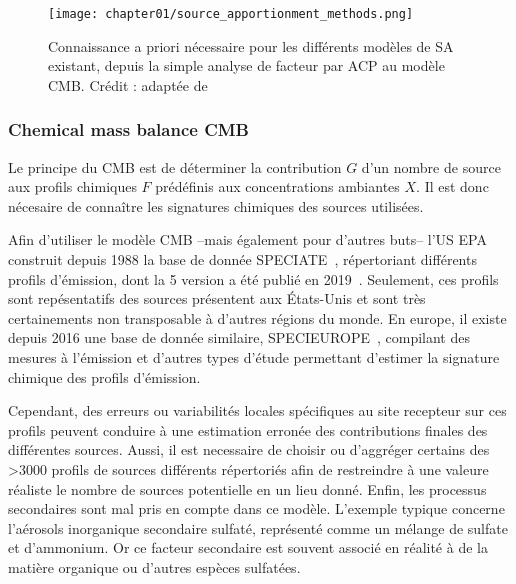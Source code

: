 \begin{figure}[ht]
    \centering
    \texttt{[image: chapter01/source\_apportionment\_methods.png]}
    \caption{
        Connaissance a priori nécessaire pour les différents modèles de SA existant,
        depuis la simple analyse de facteur par ACP au modèle CMB. Crédit :
        \textcite{vianaSource2008} adaptée de \textcite{schauerCharacterization2006}
    }%
    \label{fig:chapter01/source_apportionment_methods}
\end{figure}

\subsubsection{Chemical mass balance CMB}%
\label{ssub:chemical_mass_balance_cmb}

Le principe du CMB est de déterminer la contribution $G$ d'un nombre de source
aux profils chimiques $F$ prédéfinis aux concentrations ambiantes $X$. Il est donc
nécesaire de connaître les signatures chimiques des sources utilisées.

Afin d'utiliser le modèle CMB --mais également pour d'autres buts-- l'US EPA construit
depuis 1988 la base de donnée SPECIATE~\autocite{simonDevelopment2010}, répertoriant
différents profils d'émission, dont la 5\ieme{}
version a été publié en 2019~\autocite{u.s.environmentalprotectionagencySPECIATE2019}.
Seulement, ces profils sont repésentatifs des sources présentent aux États-Unis et sont
très certainements non transposable à d'autres régions du monde.
En europe, il existe depuis 2016 une base de donnée similaire,
SPECIEUROPE~\autocite{pernigottiSPECIEUROPE2016}, compilant des mesures à l'émission et
d'autres types d'étude permettant d'estimer la signature chimique des profils d'émission.

Cependant, des erreurs ou variabilités locales spécifiques au site recepteur sur ces
profils peuvent conduire à une estimation erronée des contributions finales des
différentes sources.
Aussi, il est necessaire de choisir ou d'aggréger certains des >3000 profils de sources
différents répertoriés afin de restreindre à une valeure réaliste le nombre de sources
potentielle en un lieu donné.
Enfin, les processus secondaires sont mal pris en compte dans ce modèle. L'exemple typique
concerne l'aérosols inorganique secondaire sulfaté, représenté comme un mélange de sulfate
et d'ammonium. Or ce facteur secondaire est souvent associé en réalité à de la matière
organique ou d'autres espèces sulfatées.

